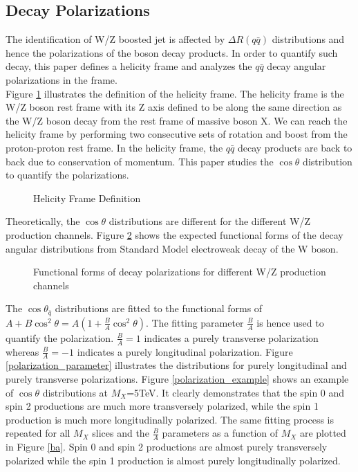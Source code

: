 \documentclass[12pt]{article}
\begin{document}
\subsection{Decay Polarizations}
The identification of W/Z boosted jet is affected by $\Delta R(q\bar{q})$ distributions and hence the polarizations of the boson decay products. In order to quantify such decay, this paper defines a helicity frame and analyzes the $q\bar{q}$ decay angular polarizations in the frame.\\
Figure \ref{helicity} illustrates the definition of the helicity frame. The helicity frame is the W/Z boson rest frame with its Z axis defined to be along the same direction as the W/Z boson decay from the rest frame of massive boson X. We can reach the helicity frame by performing two consecutive sets of rotation and boost from the proton-proton rest frame. In the helicity frame, the $q\bar{q}$ decay products are back to back due to conservation of momentum. This paper studies the $\cos\theta$ distribution to quantify the polarizations.
\begin{figure}[H]
\begin{center}
\caption[Caption for LOF]{Helicity Frame Definition}
\label{helicity}
\end{center}
\end{figure}
Theoretically, the $\cos\theta$ distributions are different for the different W/Z production channels. Figure \ref{polarization_interpretation} shows the expected functional forms of the decay angular distributions from Standard Model electroweak decay of the W boson.\\
\begin{figure}[H]
\begin{center}
\caption[Caption for LOF]{Functional forms of decay polarizations for different W/Z production channels}
\label{polarization_interpretation}
\end{center}
\end{figure}
The $\cos\theta_{\bar{q}}$ distributions are fitted to the functional forms of $A+B\cos^2\theta=A(1+\frac{B}{A}\cos^2\theta)$. The fitting parameter $\frac{B}{A}$ is hence used to quantify the polarization. $\frac{B}{A}=1$ indicates a purely transverse polarization whereas $\frac{B}{A}=-1$ indicates a purely longitudinal polarization. Figure \ref{polarization_parameter} illustrates the distributions for purely longitudinal and purely transverse polarizations. Figure \ref{polarization_example} shows an example of $\cos\theta$ distributions at $M_X$=5TeV. It clearly demonstrates that the spin 0 and spin 2 productions are much more transversely polarized, while the spin 1 production is much more longitudinally polarized. The same fitting process is repeated for all $M_X$ slices and the $\frac{B}{A}$ parameters as a function of $M_X$ are plotted in Figure \ref{ba}. Spin 0 and spin 2 productions are almost purely transversely polarized while the spin 1 production is almost purely longitudinally polarized.
\end{document}
